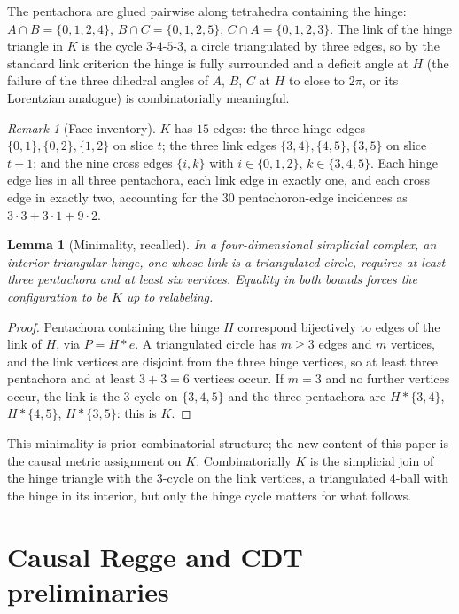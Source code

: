 \documentclass[11pt]{article}
\newtheorem{lemma}[theorem]{Lemma}
\theoremstyle{definition}
\theoremstyle{remark}
\newtheorem{remark}[theorem]{Remark}
\newcommand{\Kmin}{K}
\begin{document}
The pentachora are glued pairwise along tetrahedra containing the hinge: $A\cap B=\{0,1,2,4\}$, $B\cap C=\{0,1,2,5\}$, $C\cap A=\{0,1,2,3\}$. The link of the hinge triangle in $\Kmin$ is the cycle $3$-$4$-$5$-$3$, a circle triangulated by three edges, so by the standard link criterion \cite{Munkres} the hinge is fully surrounded and a deficit angle at $H$ (the failure of the three dihedral angles of $A$, $B$, $C$ at $H$ to close to $2\pi$, or its Lorentzian analogue) is combinatorially meaningful.

\begin{remark}[Face inventory]
\label{rem:inventory}
$\Kmin$ has $15$ edges: the three hinge edges $\{0,1\},\{0,2\},\{1,2\}$ on slice $t$; the three link edges $\{3,4\},\{4,5\},\{3,5\}$ on slice $t+1$; and the nine cross edges $\{i,k\}$ with $i\in\{0,1,2\}$, $k\in\{3,4,5\}$. Each hinge edge lies in all three pentachora, each link edge in exactly one, and each cross edge in exactly two, accounting for the $30$ pentachoron-edge incidences as $3\cdot 3+3\cdot 1+9\cdot 2$.
\end{remark}

\begin{lemma}[Minimality, recalled]
\label{lem:minimal}
In a four-dimensional simplicial complex, an interior triangular hinge, one whose link is a triangulated circle, requires at least three pentachora and at least six vertices. Equality in both bounds forces the configuration to be $\Kmin$ up to relabeling.
\end{lemma}

\begin{proof}
Pentachora containing the hinge $H$ correspond bijectively to edges of the link of $H$, via $P=H\ast e$. A triangulated circle has $m\ge 3$ edges and $m$ vertices, and the link vertices are disjoint from the three hinge vertices, so at least three pentachora and at least $3+3=6$ vertices occur. If $m=3$ and no further vertices occur, the link is the $3$-cycle on $\{3,4,5\}$ and the three pentachora are $H\ast\{3,4\}$, $H\ast\{4,5\}$, $H\ast\{3,5\}$: this is $\Kmin$.
\end{proof}

This minimality is prior combinatorial structure; the new content of this paper is the causal metric assignment on $\Kmin$. Combinatorially $\Kmin$ is the simplicial join of the hinge triangle with the $3$-cycle on the link vertices, a triangulated 4-ball with the hinge in its interior, but only the hinge cycle matters for what follows.

\section{Causal Regge and CDT preliminaries}
\label{sec:prelim}
\end{document}
